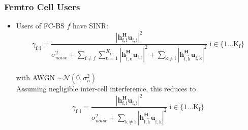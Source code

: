 \documentclass[12pt]{article}
\begin{document}
\subsubsection{Femtro Cell Users}
\begin{itemize}



\item Users of FC-BS $f$ have SINR:
	\begin{equation*}
	\gamma_{\mathrm{f,i}} = \frac{|\mathbf{h^H_{\mathrm{f,i}}u_{\mathrm{f,i}}}|^2}
	{\sigma^2_{noise}   + \sum_{\mathrm{\tilde{f}}\neq f} \sum_{\mathrm{u=1}
	}^{K_{\mathrm{\tilde{f}}}}
	|\mathbf{h^H_{\mathrm{\tilde{f},u}}u_{\mathrm{f,i}}}|^2
	 + \sum_{\mathrm{\tilde{k}\neq i}}
	  |\mathbf{h^H_{\mathrm{f,\tilde{k}}}u_{\mathrm{f,\tilde{k}}}}|^2}
	  \; \mathrm{i \in \{1 ... K_f\}}\end{equation*}
\\
with AWGN $\sim \mathcal{N}(0,\sigma^2_n)$
\\

Assuming negligible inter-cell interference, this reduces to
	\begin{equation*}
	\gamma_{\mathrm{f,i}} = \frac{|\mathbf{h^H_{\mathrm{f,i}}u_{\mathrm{f,i}}}|^2}
	{\sigma^2_{noise} 
	 + \sum_{\mathrm{\tilde{k}\neq i}}
	  |\mathbf{h^H_{\mathrm{f,\tilde{k}}}u_{\mathrm{f,\tilde{k}}}}|^2}
	  \; \mathrm{i \in \{1 ... K_f\}}
	\end{equation*}
\\

%

\end{itemize}


%
%
\end{document}
